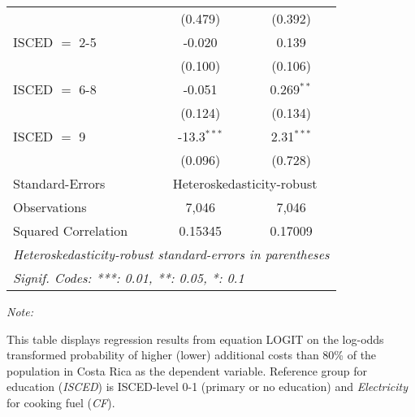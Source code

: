 \begin{table}[htbp!]
\begin{adjustbox}{width = 1\textwidth, max height = 0.95\textheight, center}
\begin{threeparttable}[b]
\begin{tabular}{lcc}
                                 & (0.479)        & (0.392)\\   
            ISCED $=$ 2-5        & -0.020         & 0.139\\   
                                 & (0.100)        & (0.106)\\   
            ISCED $=$ 6-8        & -0.051         & 0.269$^{**}$\\   
                                 & (0.124)        & (0.134)\\   
            ISCED $=$ 9          & -13.3$^{***}$  & 2.31$^{***}$\\   
                                 & (0.096)        & (0.728)\\   
            \midrule 
            Standard-Errors & \multicolumn{2}{c}{Heteroskedasticity-robust} \\ 
            Observations         & 7,046          & 7,046\\  
            Squared Correlation  & 0.15345        & 0.17009\\  
            \midrule \midrule
            \multicolumn{3}{l}{\emph{Heteroskedasticity-robust standard-errors in parentheses}}\\
            \multicolumn{3}{l}{\emph{Signif. Codes: ***: 0.01, **: 0.05, *: 0.1}}\\
         \end{tabular}
         
         \begin{tablenotes}\item \medskip \textit{Note:}
            \item This table displays regression results from equation LOGIT on the log-odds transformed probability of higher (lower) additional costs than 80\% of the population in Costa Rica as the dependent variable. Reference group for education (\textit{ISCED}) is ISCED-level 0-1 (primary or no education) and \textit{Electricity} for cooking fuel (\textit{CF}).
         \end{tablenotes}
      \end{threeparttable}
   \end{adjustbox}
\end{table}


